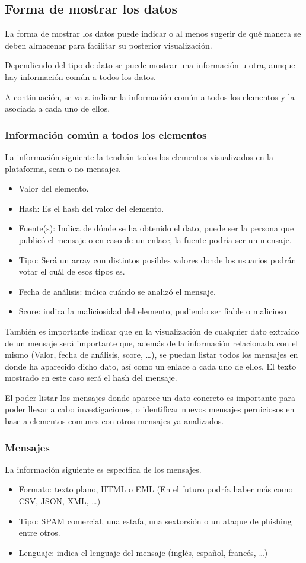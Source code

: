 \subsection{Forma de mostrar los datos}
La forma de mostrar los datos puede indicar o al menos sugerir de qué manera se deben almacenar para facilitar su posterior visualización.

Dependiendo del tipo de dato se puede mostrar una información u otra, aunque hay información común a todos los datos.

A continuación, se va a indicar la información común a todos los elementos y la asociada a cada uno de ellos. 


\subsubsection{Información común a todos los elementos}
La información siguiente la tendrán todos los elementos visualizados en la plataforma, sean o no mensajes. 
\begin{itemize}
    \item Valor del elemento.
    \item Hash: Es el hash del valor del elemento. 
    \item Fuente(s): Indica de dónde se ha obtenido el dato, puede ser la persona que publicó el mensaje o en caso de un enlace, la fuente podría ser un mensaje. 
    \item Tipo: Será un array con distintos posibles valores donde los usuarios podrán votar el cuál de esos tipos es.  
    \item Fecha de análisis: indica cuándo se analizó el mensaje. 
    \item Score: indica la maliciosidad del elemento, pudiendo ser fiable o malicioso
\end{itemize}

También es importante indicar que en la visualización de cualquier dato extraído de un mensaje será importante que, además de la información relacionada con el mismo (Valor, fecha de análisis, score, …), se puedan listar todos los mensajes en donde ha aparecido dicho dato, así como un enlace a cada uno de ellos. El texto mostrado en este caso será el hash del mensaje.

El poder listar los mensajes donde aparece un dato concreto es importante para poder llevar a cabo investigaciones, o identificar nuevos mensajes perniciosos en base a elementos comunes con otros mensajes ya analizados.

\subsubsection{Mensajes}
La información siguiente es específica de los mensajes.
\begin{itemize}
    \item Formato: texto plano, HTML o EML (En el futuro podría haber más como CSV, JSON, XML, …)
    \item Tipo: SPAM comercial, una estafa, una sextorsión o un ataque de phishing entre otros. 
    \item Lenguaje: indica el lenguaje del mensaje (inglés, español, francés, …)
\end{itemize}

